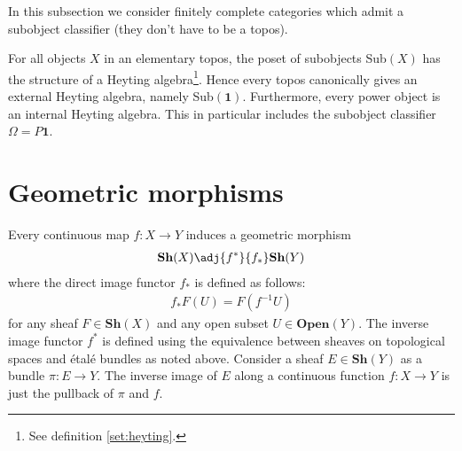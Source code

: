 	In this subsection we consider finitely complete categories which admit a subobject classifier (they don't have to be a topos).
	
	
	\begin{property}
		For all objects $X$ in an elementary topos, the poset of subobjects Sub$(X)$ has the structure of a Heyting algebra\footnote{See definition \ref{set:heyting}.}. Hence every topos canonically gives an external Heyting algebra, namely Sub$(\mathbf{1})$. Furthermore, every power object is an internal Heyting algebra. This in particular includes the subobject classifier $\Omega=P{\mathbf{1}}$.
	\end{property}

\section{Geometric morphisms}


	
	\begin{example}
		Every continuous map $f:X\rightarrow Y$ induces a geometric morphism
		\begin{gather}
			\textbf{Sh}(X)\adj{f^*}{f_*}\textbf{Sh}(Y)
		\end{gather}
		where the direct image functor $f_*$ is defined as follows:
		\begin{gather}
			f_*F(U) = F(f^{-1}U)
		\end{gather}
		for any sheaf $F\in\textbf{Sh}(X)$ and any open subset $U\in\textbf{Open}(Y)$. The inverse image functor $f^*$ is defined using the equivalence between sheaves on topological spaces and \'etal\'e bundles as noted above. Consider a sheaf $E\in\mathbf{Sh}(Y)$ as a bundle $\pi:E\rightarrow Y$. The inverse image of $E$ along a continuous function $f:X\rightarrow Y$ is just the pullback of $\pi$ and $f$.
	\end{example}
	
